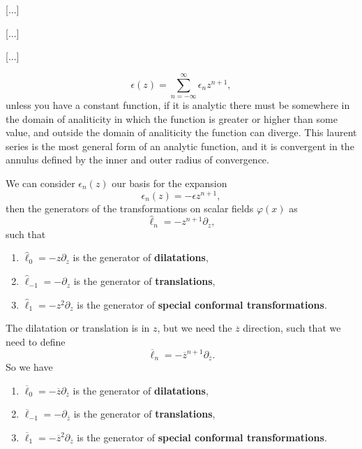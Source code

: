 















[...]

[...]

[...]


\[
    \epsilon(z) = \sum_{n = -\infty}^{\infty} \epsilon_n z^{n + 1},
\]
unless you have a constant function, if it is analytic there must be somewhere in the domain of analiticity in which the function is greater or higher than some value, and outside the domain of analiticity the function can diverge. This laurent series is the most general form of an analytic function, and it is convergent in the annulus defined by the inner and outer radius of convergence.

We can consider \(\epsilon_n(z)\) our basis for the expansion
\[
    \epsilon_n(z) = - \epsilon z^{n + 1},
\]
then the generators of the transformations on scalar fields \(\varphi(x)\) as
\[
    \hat{\ell}_n = - z^{n + 1} \partial_z,
\]
such that
\begin{enumerate}
    \item \(\hat{\ell}_0 = -z \partial_z\) is the generator of \textbf{dilatations},
    \item \(\hat{\ell}_{-1} = -\partial_z\) is the generator of \textbf{translations},
    \item \(\hat{\ell}_1 = -z^2 \partial_z\) is the generator of \textbf{special conformal transformations}.
\end{enumerate}

The dilatation or translation is in \(z\), but we need the \(\overline{z}\) direction, such that we need to define
\[
    \overline{\ell}_n = - \overline{z}^{n + 1} \partial_{\overline{z}}.
\]
So we have
\begin{enumerate}
    \item \(\overline{\ell}_0 = -\overline{z} \partial_{\overline{z}}\) is the generator of \textbf{dilatations},
    \item \(\overline{\ell}_{-1} = -\partial_{\overline{z}}\) is the generator of \textbf{translations},
    \item \(\overline{\ell}_1 = -\overline{z}^2 \partial_{\overline{z}}\) is the generator of \textbf{special conformal transformations}.
\end{enumerate}

